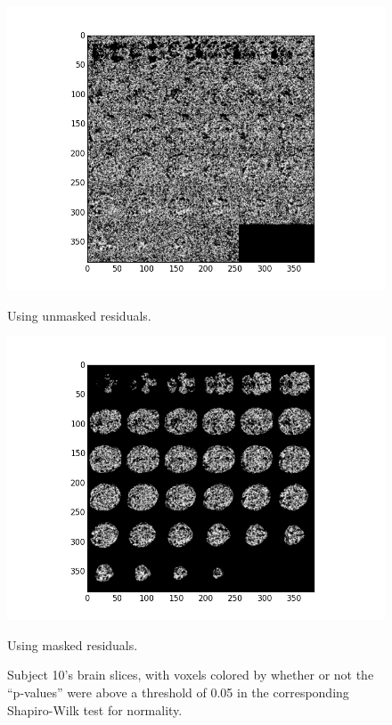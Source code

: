 \begin{figure}[ht]
\centering
\begin{minipage}[b]{0.45\linewidth}
	\centering
	\includegraphics[width=.8\linewidth]{../images/sub010sw.png} 
	\caption{Using unmasked residuals.}
\end{minipage}	
\quad
\begin{minipage}[b]{0.45\linewidth}
	\centering
		\includegraphics[width=.8\linewidth]{../images/sub010swmasked.png} 
	\caption{Using masked residuals.}
\end{minipage}
\caption{Subject 10's brain slices, with voxels colored by whether or not the 
``p-values'' were above a threshold of 0.05 in the corresponding Shapiro-Wilk 
test for normality.}
\label{fig:sw}
\end{figure}
